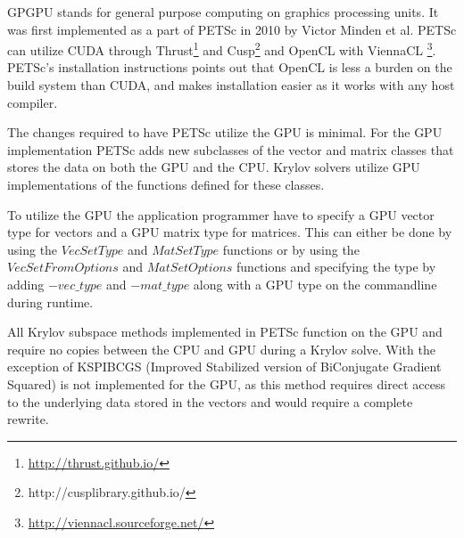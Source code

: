 GPGPU stands for general purpose computing on graphics processing units. It was 
first implemented as a part of PETSc in 2010\cite{minden2010preliminary} by Victor 
Minden et al. PETSc can utilize CUDA through Thrust\footnote{\url{http://thrust.github.io/}} 
and Cusp\footnote{http://cusplibrary.github.io/} and OpenCL with ViennaCL
\footnote{\url{http://viennacl.sourceforge.net/}}. PETSc's installation instructions 
points out that OpenCL is less a burden on the build system than CUDA, and makes 
installation easier as it works with any host compiler. 

The changes required to have PETSc utilize the GPU is minimal. For the GPU 
implementation PETSc adds new subclasses of the vector and matrix classes that 
stores the data on both the GPU and the CPU. Krylov solvers utilize GPU implementations 
of the functions defined for these classes.

To utilize the GPU the application programmer have to specify a GPU vector type 
for vectors and a GPU matrix type for matrices. This can either be done by using 
the $VecSetType$ and $MatSetType$ functions or by using the $VecSetFromOptions$ 
and $MatSetOptions$ functions and specifying the type by adding $-vec\_type$ and 
$-mat\_type$ along with a GPU type on the commandline during runtime. 

All Krylov subspace methods implemented in PETSc function on the GPU and require 
no copies between the CPU and GPU during a Krylov solve. With the exception
of KSPIBCGS (Improved Stabilized version of BiConjugate Gradient Squared) is not
implemented for the GPU, as this method requires direct access to the underlying 
data stored in the vectors and would require a complete rewrite.

